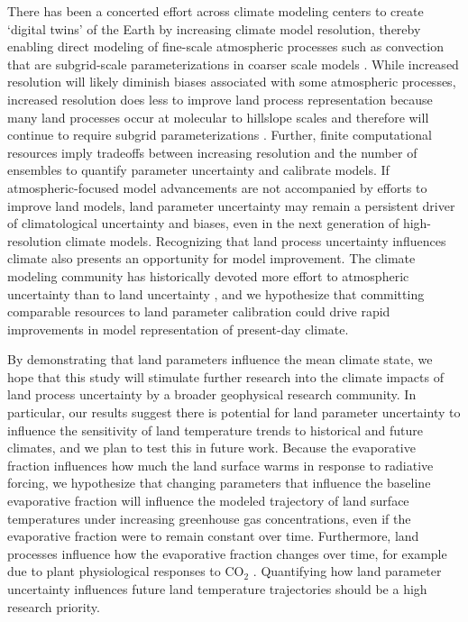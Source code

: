 \documentclass[draft]{agujournal2019}
\begin{document}
There has been a concerted effort across climate modeling centers to create ‘digital twins’ of the Earth \citep[e.g., ][]{voosen_europe_2020, li_big_2023} by increasing climate model resolution, thereby enabling direct modeling of fine-scale atmospheric processes such as convection that are subgrid-scale parameterizations in coarser scale models \citep{betancourt_are_2022}. While increased resolution will likely diminish biases associated with some atmospheric processes, increased resolution does less to improve land process representation because many land processes occur at molecular to hillslope scales and therefore will continue to require subgrid parameterizations \citep{fisher_perspectives_2020,reichstein_deep_2019,balaji_are_2022}. Further, finite computational resources imply tradeoffs between increasing resolution and the number of ensembles to quantify parameter uncertainty and calibrate models. If atmospheric-focused model advancements are not accompanied by efforts to improve land models, land parameter uncertainty may remain a persistent driver of climatological uncertainty and biases, even in the next generation of high-resolution climate models. Recognizing that land process uncertainty influences climate also presents an opportunity for model improvement. The climate modeling community has historically devoted more effort to atmospheric uncertainty than to land uncertainty \citep{hourdin_art_2017}, and we hypothesize that committing comparable resources to land parameter calibration could drive rapid improvements in model representation of present-day climate.

By demonstrating that land parameters influence the mean climate state, we hope that this study will stimulate further research into the climate impacts of land process uncertainty by a broader geophysical research community. In particular, our results suggest there is potential for land parameter uncertainty to influence the sensitivity of land temperature trends to historical and future climates, and we plan to test this in future work. Because the evaporative fraction influences how much the land surface warms in response to radiative forcing, we hypothesize that changing parameters that influence the baseline evaporative fraction will influence the modeled trajectory of land surface temperatures under increasing greenhouse gas concentrations, even if the evaporative fraction were to remain constant over time. Furthermore, land processes influence how the evaporative fraction changes over time, for example due to plant physiological responses to CO$_2$ \citep{lemordant_critical_2018}. Quantifying how land parameter uncertainty influences future land temperature trajectories should be a high research priority.
\end{document}
